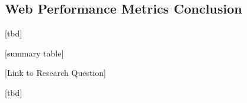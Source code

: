 
\subsection{Web Performance Metrics Conclusion}


[tbd]
























[summary table]




[Link to Research Question]



[tbd]




